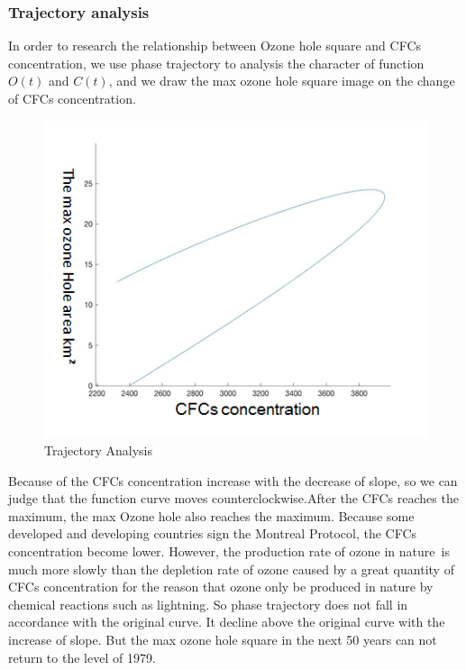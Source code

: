 \documentclass[12pt]{article}
\begin{document}
\subsubsection{Trajectory analysis}
In order to research the relationship between Ozone hole square and CFCs concentration, we use phase trajectory to analysis the character of function $O(t)$ and $C(t)$, and we draw the max ozone hole square image on the change of CFCs concentration.
\begin{center}
\begin{figure}[htpb]
\centering
\includegraphics[scale=0.6]{tl}
\caption{Trajectory Analysis}\label{fig:xgx}
\end{figure}
\end{center}
Because of the CFCs concentration increase with the decrease of slope, so we can judge that the function curve moves counterclockwise.After the CFCs reaches the maximum, the max Ozone hole also reaches the maximum. Because some developed and developing countries sign the Montreal Protocol, the CFCs \cite{sokhi2006prediction} concentration become lower. However, the production rate of ozone in nature is much more slowly than the depletion rate of ozone caused by a great quantity of CFCs concentration for the reason that ozone only be produced in nature by chemical reactions such as lightning. So phase trajectory does not fall in accordance with the original curve. It decline above the original curve with the increase of slope. But the max ozone hole square in the next 50 years can not return to the level of 1979.
\end{document}

